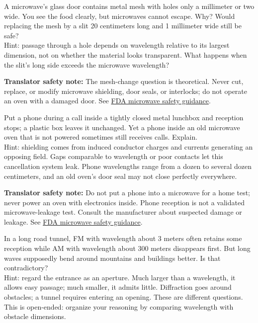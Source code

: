\begin{puzzles}
\item A microwave's glass door contains metal mesh with holes only a millimeter or two wide. You see the food clearly, but microwaves cannot escape. Why? Would replacing the mesh by a slit 20 centimeters long and 1 millimeter wide still be safe?\\
Hint: passage through a hole depends on wavelength relative to its largest dimension, not on whether the material looks transparent. What happens when the slit's long side exceeds the microwave wavelength?

\textbf{Translator safety note:} The mesh-change question is theoretical. Never cut, replace, or modify microwave shielding, door seals, or interlocks; do not operate an oven with a damaged door. See \href{https://www.fda.gov/radiation-emitting-products/resources-you-radiation-emitting-products/microwave-ovens}{FDA microwave safety guidance}.

\item Put a phone during a call inside a tightly closed metal lunchbox and reception stops; a plastic box leaves it unchanged. Yet a phone inside an old microwave oven that is not powered sometimes still receives calls. Explain.\\
Hint: shielding comes from induced conductor charges and currents generating an opposing field. Gaps comparable to wavelength or poor contacts let this cancellation system leak. Phone wavelengths range from a dozen to several dozen centimeters, and an old oven's door seal may not close perfectly everywhere.

\textbf{Translator safety note:} Do not put a phone into a microwave for a home test; never power an oven with electronics inside. Phone reception is not a validated microwave-leakage test. Consult the manufacturer about suspected damage or leakage. See \href{https://www.fda.gov/radiation-emitting-products/resources-you-radiation-emitting-products/microwave-ovens}{FDA microwave safety guidance}.

\item In a long road tunnel, FM with wavelength about 3 meters often retains some reception while AM with wavelength about 300 meters disappears first. But long waves supposedly bend around mountains and buildings better. Is that contradictory?\\
Hint: regard the entrance as an aperture. Much larger than a wavelength, it allows easy passage; much smaller, it admits little. Diffraction goes around obstacles; a tunnel requires entering an opening. These are different questions. This is open-ended: organize your reasoning by comparing wavelength with obstacle dimensions.


\end{puzzles}
